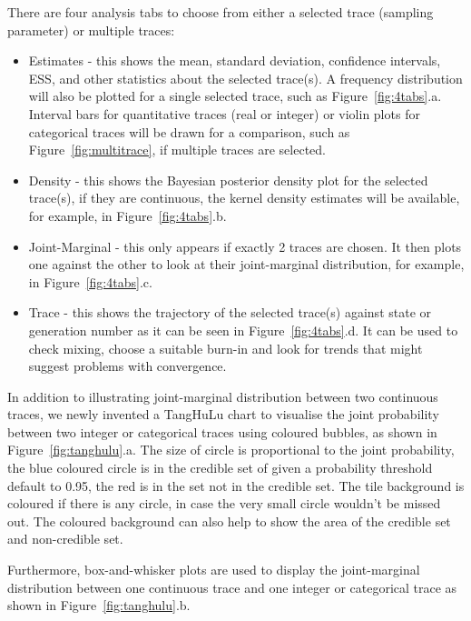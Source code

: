 \documentclass{bioinfo}
\begin{document}
There are four analysis tabs to choose from either a selected trace (sampling parameter) or multiple traces:

\begin{itemize}
\item Estimates - this shows the mean, standard deviation, confidence intervals, ESS, and other statistics about the selected trace(s). A frequency distribution will also be plotted for a single selected trace, such as Figure~\ref{fig:4tabs}.a. Interval bars for quantitative traces (real or integer) or violin plots for categorical traces will be drawn for a comparison, such as Figure~\ref{fig:multitrace}, if multiple traces are selected.

\item Density - this shows the Bayesian posterior density plot for the selected trace(s), if they are continuous, the kernel density estimates will be available, for example, in Figure~\ref{fig:4tabs}.b.

\item Joint-Marginal - this only appears if exactly 2 traces are chosen. It then plots one against the other to look at their joint-marginal distribution, for example, in Figure~\ref{fig:4tabs}.c.

\item Trace - this shows the trajectory of the selected trace(s) against state or generation number as it can be seen in Figure~\ref{fig:4tabs}.d. It can be used to check mixing, choose a suitable burn-in and look for trends that might suggest problems with convergence.

\end{itemize}

In addition to illustrating joint-marginal distribution between two continuous traces, we newly invented a TangHuLu chart to visualise the joint probability between two integer or categorical traces using coloured bubbles, as shown in Figure~\ref{fig:tanghulu}.a. The size of circle is proportional to the joint probability, the blue coloured circle is in the credible set of given a probability threshold default to 0.95, the red is in the set not in the credible set. The tile background is coloured if there is any circle, in case the very small circle wouldn't be missed out. The coloured background can also help to show the area of the credible set and non-credible set.

Furthermore, box-and-whisker plots are used to display the joint-marginal distribution between one continuous trace and one integer or categorical trace as shown in Figure~\ref{fig:tanghulu}.b. 
\end{document}
